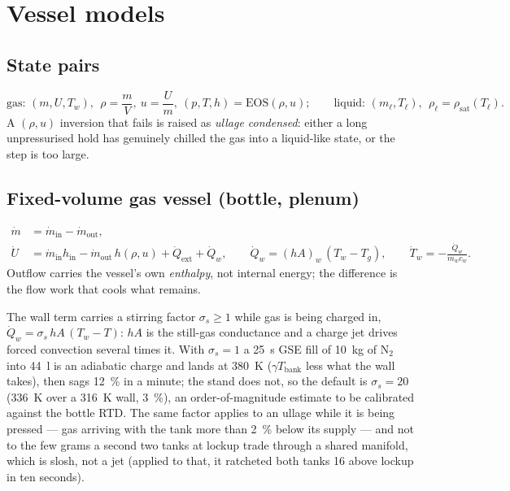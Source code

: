 \documentclass[11pt,a4paper]{article}
\newcommand{\mdot}{\dot{m}}
\newcommand{\Qdot}{\dot{Q}}
\begin{document}
\section{Vessel models}\label{sec:vessels}

\subsection{State pairs}
\begin{equation}
  \text{gas: } (m,U,T_w),\ \ \rho=\frac{m}{V},\ u=\frac{U}{m},\ (p,T,h)=\mathrm{EOS}(\rho,u);
  \qquad
  \text{liquid: } (m_\ell, T_\ell),\ \ \rho_\ell = \rho_{\mathrm{sat}}(T_\ell).
\end{equation}
A $(\rho,u)$ inversion that fails is raised as \emph{ullage condensed}: either
a long unpressurised hold has genuinely chilled the gas into a liquid-like
state, or the step is too large.

\subsection{Fixed-volume gas vessel (bottle, plenum)}
\begin{align}
  \dot m &= \mdot_{\mathrm{in}}-\mdot_{\mathrm{out}},\\
  \dot U &= \mdot_{\mathrm{in}}h_{\mathrm{in}} - \mdot_{\mathrm{out}}\,h(\rho,u) + \Qdot_{\mathrm{ext}} + \Qdot_w,
  \qquad \Qdot_w = (hA)_w\,(T_w-T_g),\qquad
  \dot T_w = -\frac{\Qdot_w}{m_wc_w}.
  \label{eq:bottle}
\end{align}
Outflow carries the vessel's own \emph{enthalpy}, not internal energy; the
difference is the flow work that cools what remains.

The wall term carries a stirring factor $\sigma_s\ge 1$ while gas is
being charged in, $\Qdot_w = \sigma_s\,hA\,(T_w-T)$: $hA$ is the still-gas
conductance and a charge jet drives forced convection several times it. With
$\sigma_s=1$ a \SI{25}{\second} GSE fill of \SI{10}{\kilogram} of N$_2$ into
\SI{44}{\litre} is an adiabatic charge and lands at \SI{380}{\kelvin}
($\gamma T_{\mathrm{bank}}$ less what the wall takes), then sags \SI{12}{\percent}
in a minute; the stand does not, so the default is $\sigma_s=20$
(\SI{336}{\kelvin} over a \SI{316}{\kelvin} wall, \SI{3}{\percent}), an
order-of-magnitude estimate to be calibrated against the bottle RTD. The same
factor applies to an ullage while it is being pressed --- gas arriving with
the tank more than \SI{2}{\percent} below its supply --- and not to the few
grams a second two tanks at lockup trade through a shared manifold, which is
slosh, not a jet (applied to that, it ratcheted both tanks \SI{16}{\psi}
above lockup in ten seconds).
\end{document}
